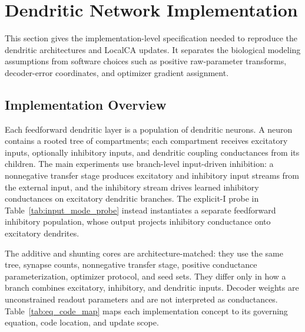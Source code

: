     
    \section{Dendritic Network Implementation}
    \label{app:implementation}
    This section gives the implementation-level specification needed to reproduce the dendritic architectures and LocalCA updates. It separates the biological modeling assumptions from software choices such as positive raw-parameter transforms, decoder-error coordinates, and optimizer gradient assignment.
    
    \subsection{Implementation Overview}
    
    Each feedforward dendritic layer is a population of dendritic neurons. A neuron contains a rooted tree of compartments; each compartment receives excitatory inputs, optionally inhibitory inputs, and dendritic coupling conductances from its children. The main experiments use branch-level input-driven inhibition: a nonnegative transfer stage produces excitatory and inhibitory input streams from the external input, and the inhibitory stream drives learned inhibitory conductances on excitatory dendritic branches. The explicit-I probe in Table~\ref{tab:input_mode_probe} instead instantiates a separate feedforward inhibitory population, whose output projects inhibitory conductance onto excitatory dendrites.
    
    The additive and shunting cores are architecture-matched: they use the same tree, synapse counts, nonnegative transfer stage, positive conductance parameterization, optimizer protocol, and seed sets. They differ only in how a branch combines excitatory, inhibitory, and dendritic inputs. Decoder weights are unconstrained readout parameters and are not interpreted as conductances. Table~\ref{tab:eq_code_map} maps each implementation concept to its governing equation, code location, and update scope.
    
